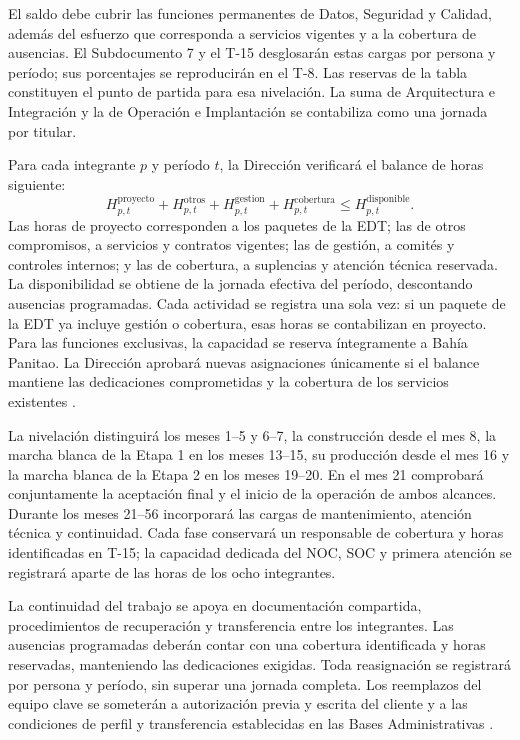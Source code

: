 El saldo debe cubrir las funciones permanentes de Datos, Seguridad y Calidad, además del esfuerzo que corresponda a servicios vigentes y a la cobertura de ausencias. El Subdocumento 7 y el T-15 desglosarán estas cargas por persona y período; sus porcentajes se reproducirán en el T-8. Las reservas de la tabla constituyen el punto de partida para esa nivelación. La suma de Arquitectura e Integración y la de Operación e Implantación se contabiliza como una jornada por titular.

Para cada integrante $p$ y período $t$, la Dirección verificará el balance de horas siguiente:
\begin{equation}
  H^{\mathrm{proyecto}}_{p,t}+H^{\mathrm{otros}}_{p,t}
  +H^{\mathrm{gestion}}_{p,t}+H^{\mathrm{cobertura}}_{p,t}
  \leq H^{\mathrm{disponible}}_{p,t}.
\end{equation}
Las horas de proyecto corresponden a los paquetes de la EDT; las de otros compromisos, a servicios y contratos vigentes; las de gestión, a comités y controles internos; y las de cobertura, a suplencias y atención técnica reservada. La disponibilidad se obtiene de la jornada efectiva del período, descontando ausencias programadas. Cada actividad se registra una sola vez: si un paquete de la EDT ya incluye gestión o cobertura, esas horas se contabilizan en proyecto. Para las funciones exclusivas, la capacidad se reserva íntegramente a Bahía Panitao. La Dirección aprobará nuevas asignaciones únicamente si el balance mantiene las dedicaciones comprometidas y la cobertura de los servicios existentes \parencite[sec.~19.2, pp.~33--34]{bases-transversales}.

La nivelación distinguirá los meses 1--5 y 6--7, la construcción desde el mes 8, la marcha blanca de la Etapa 1 en los meses 13--15, su producción desde el mes 16 y la marcha blanca de la Etapa 2 en los meses 19--20. En el mes 21 comprobará conjuntamente la aceptación final y el inicio de la operación de ambos alcances. Durante los meses 21--56 incorporará las cargas de mantenimiento, atención técnica y continuidad. Cada fase conservará un responsable de cobertura y horas identificadas en T-15; la capacidad dedicada del NOC, SOC y primera atención se registrará aparte de las horas de los ocho integrantes.

La continuidad del trabajo se apoya en documentación compartida, procedimientos de recuperación y transferencia entre los integrantes. Las ausencias programadas deberán contar con una cobertura identificada y horas reservadas, manteniendo las dedicaciones exigidas. Toda reasignación se registrará por persona y período, sin superar una jornada completa. Los reemplazos del equipo clave se someterán a autorización previa y escrita del cliente y a las condiciones de perfil y transferencia establecidas en las Bases Administrativas \parencite[art.~76, p.~39]{bases-admin}.

